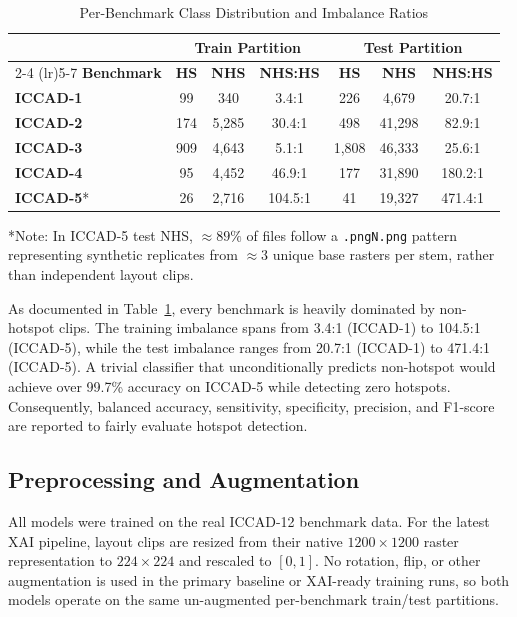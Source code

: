 \documentclass[conference]{IEEEtran}
\begin{document}
\begin{table}[htbp]
\caption{Per-Benchmark Class Distribution and Imbalance Ratios}
\label{tab:dataset}
\centering
\setlength{\tabcolsep}{3pt}
\begin{tabular}{lcccccc}
\toprule
 & \multicolumn{3}{c}{\textbf{Train Partition}} & \multicolumn{3}{c}{\textbf{Test Partition}} \\
\cmidrule(lr){2-4} \cmidrule(lr){5-7}
\textbf{Benchmark} & \textbf{HS} & \textbf{NHS} & \textbf{NHS:HS} & \textbf{HS} & \textbf{NHS} & \textbf{NHS:HS} \\
\midrule
\textbf{ICCAD-1} & 99 & 340 & 3.4:1 & 226 & 4,679 & 20.7:1 \\
\textbf{ICCAD-2} & 174 & 5,285 & 30.4:1 & 498 & 41,298 & 82.9:1 \\
\textbf{ICCAD-3} & 909 & 4,643 & 5.1:1 & 1,808 & 46,333 & 25.6:1 \\
\textbf{ICCAD-4} & 95 & 4,452 & 46.9:1 & 177 & 31,890 & 180.2:1 \\
\textbf{ICCAD-5}* & 26 & 2,716 & 104.5:1 & 41 & 19,327 & 471.4:1 \\
\bottomrule
\end{tabular}
\vspace{1mm}
\begin{flushleft}
\footnotesize{*Note: In ICCAD-5 test NHS, $\approx 89\%$ of files follow a \texttt{.pngN.png} pattern representing synthetic replicates from $\approx 3$ unique base rasters per stem, rather than independent layout clips.}
\end{flushleft}
\end{table}

As documented in Table~\ref{tab:dataset}, every benchmark is heavily dominated by non-hotspot clips. The training imbalance spans from 3.4:1 (ICCAD-1) to 104.5:1 (ICCAD-5), while the test imbalance ranges from 20.7:1 (ICCAD-1) to 471.4:1 (ICCAD-5). A trivial classifier that unconditionally predicts non-hotspot would achieve over 99.7\% accuracy on ICCAD-5 while detecting zero hotspots. Consequently, balanced accuracy, sensitivity, specificity, precision, and F1-score are reported to fairly evaluate hotspot detection.

\subsection{Preprocessing and Augmentation}
All models were trained on the real ICCAD-12 benchmark data. For the latest XAI pipeline, layout clips are resized from their native $1200\times1200$ raster representation to $224\times224$ and rescaled to $[0,1]$. No rotation, flip, or other augmentation is used in the primary baseline or XAI-ready training runs, so both models operate on the same un-augmented per-benchmark train/test partitions.
\end{document}
